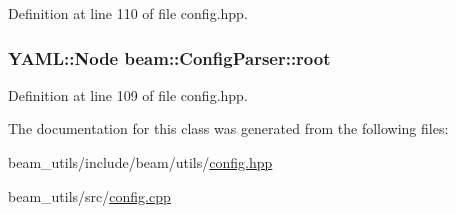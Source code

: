 Definition at line 110 of file config.\+hpp.

\subsubsection[{\texorpdfstring{root}{root}}]{\setlength{\rightskip}{0pt plus 5cm}Y\+A\+M\+L\+::\+Node beam\+::\+Config\+Parser\+::root}\hypertarget{classbeam_1_1_config_parser_af7194358406b989236ad11515a19d963}{}\label{classbeam_1_1_config_parser_af7194358406b989236ad11515a19d963}


Definition at line 109 of file config.\+hpp.



The documentation for this class was generated from the following files\+:\begin{DoxyCompactItemize}
\item 
beam\+\_\+utils/include/beam/utils/\hyperlink{config_8hpp}{config.\+hpp}\item 
beam\+\_\+utils/src/\hyperlink{config_8cpp}{config.\+cpp}\end{DoxyCompactItemize}
